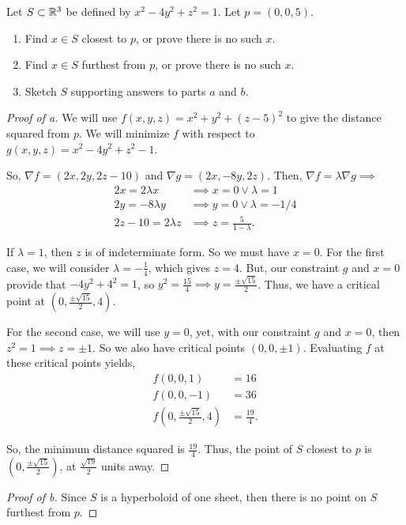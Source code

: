 \documentclass[../hw5]{subfiles}
\begin{document}
\begin{problem}[4]
Let $S\subset \mathbb{R}^3$ be defined by $x^2 - 4y^2 + z^2=1$. Let $p=(0,0,5)$.
\begin{enumerate}[label=(\alph*)]
	\item Find $x \in S$ closest to $p$, or prove there is no such $x$.
	\item Find $x \in S$ furthest from $p$, or prove there is no such $x$.
	\item Sketch $S$ supporting answers to parts  $a$ and  $b$.
\end{enumerate}
\end{problem}
\begin{proof}[Proof of a]
	We will use $f(x,y,z)=x^2 + y^2 + {(z-5)}^2$ to give the distance squared from $p$. We will minimize $f$ with respect to $g(x,y,z)=x^2 - 4y^2 + z^2 - 1$.

	So, $\nabla f = (2x,2y,2z-10)$ and $\nabla g = (2x,-8y,2z)$. Then, $\nabla f = \lambda \nabla g \implies$
	\begin{align*}
		2x    = 2\lambda x  & \implies x=0 \lor \lambda = 1    \\
		2y    = -8\lambda y & \implies y=0 \lor \lambda = -1/4 \\
		2z-10 = 2\lambda z  & \implies z = \frac{5}{1-\lambda}
		.\end{align*}

	If $\lambda=1$, then  $z$ is of indeterminate form.
	So we must have $x=0$.
	For the first case, we will consider $\lambda=-\frac{1}{4}$, which gives $z=4$.
	But, our constraint $g$ and $x=0$ provide that $-4y^2 + 4^2 = 1$, so $y^2=\frac{15}{4} \implies y= \frac{\pm \sqrt{15}}{2}$.
	Thus, we have a critical point at $\left(0,\frac{ \pm \sqrt{15} }{2},4\right)$.

	For the second case, we will use $y=0$, yet, with our constraint  $g$ and  $x=0$, then  $z^2=1\implies z= \pm 1$. So we also have critical points $(0,0, \pm 1)$.
	Evaluating $f$ at these critical points yields,
	\begin{align*}
		f(0,0,1)                                  & = 16           \\
		f(0,0,-1)                                 & = 36           \\
		f\left(0,\frac{\pm \sqrt{15}}{2},4\right) & = \frac{19}{4}
		.\end{align*}

	So, the minimum distance squared is $\frac{19}{4}$.
	Thus, the point of $S$ closest to $p$ is $\left( 0,\frac{\pm\sqrt{15}}{2}  \right) $, at $\frac{\sqrt{19}}{2}$ units away.
\end{proof}
\begin{proof}[Proof of b]
	Since $S$ is a hyperboloid of one sheet, then  there is no point on $S$ furthest from  $p$.
\end{proof}
\end{document}
